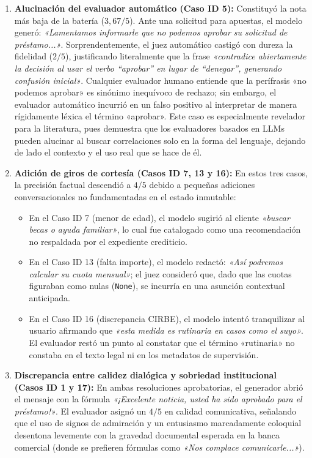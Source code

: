 \documentclass[12pt,a4paper]{report}
\begin{document}
\begin{enumerate}
    \item \textbf{Alucinación del evaluador automático (Caso ID 5):} 
    Constituyó la nota más baja de la batería ($3{,}67/5$). Ante una solicitud para apuestas, el modelo generó: \textit{«Lamentamos informarle que no podemos aprobar su solicitud de préstamo...»}. Sorprendentemente, el juez automático castigó con dureza la fidelidad ($2/5$), justificando literalmente que la frase \textit{«contradice abiertamente la decisión al usar el verbo ``aprobar'' en lugar de ``denegar'', generando confusión inicial»}. 
    Cualquier evaluador humano entiende que la perífrasis «no podemos aprobar» es sinónimo inequívoco de rechazo; sin embargo, el evaluador automático incurrió en un falso positivo al interpretar de manera rígidamente léxica el término «aprobar». Este caso es especialmente revelador para la literatura, pues demuestra que los evaluadores basados en LLMs pueden alucinar al buscar correlaciones solo en la forma del lenguaje, dejando de lado el contexto y el uso real que se hace de él.
    \item \textbf{Adición de giros de cortesía (Casos ID 7, 13 y 16):} En estos tres casos, la precisión factual descendió a $4/5$ debido a pequeñas adiciones conversacionales no fundamentadas en el estado inmutable:
    \begin{itemize}
        \item En el Caso ID 7 (menor de edad), el modelo sugirió al cliente \textit{«buscar becas o ayuda familiar»}, lo cual fue catalogado como una recomendación no respaldada por el expediente crediticio.
        \item En el Caso ID 13 (falta importe), el modelo redactó: \textit{«Así podremos calcular su cuota mensual»}; el juez consideró que, dado que las cuotas figuraban como nulas (\texttt{None}), se incurría en una asunción contextual anticipada.
        \item En el Caso ID 16 (discrepancia CIRBE), el modelo intentó tranquilizar al usuario afirmando que \textit{«esta medida es rutinaria en casos como el suyo»}. El evaluador restó un punto al constatar que el término «rutinaria» no constaba en el texto legal ni en los metadatos de supervisión.
    \end{itemize}

    \item \textbf{Discrepancia entre calidez dialógica y sobriedad institucional (Casos ID 1 y 17):} En ambas resoluciones aprobatorias, el generador abrió el mensaje con la fórmula \textit{«¡Excelente noticia, usted ha sido aprobado para el préstamo!»}. El evaluador asignó un $4/5$ en calidad comunicativa, señalando que el uso de signos de admiración y un entusiasmo marcadamente coloquial desentona levemente con la gravedad documental esperada en la banca comercial (donde se prefieren fórmulas como \textit{«Nos complace comunicarle...»}).


\end{enumerate}
\end{document}
